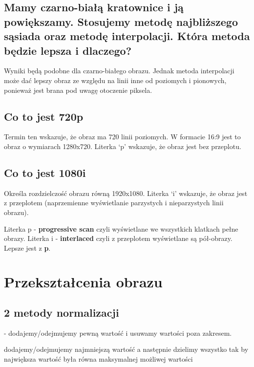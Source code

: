 \documentclass[a4paper, 12pt, titlepage]{article}
\begin{document}
\subsection{Mamy czarno-białą kratownice i ją powiększamy. Stosujemy metodę najbliższego sąsiada oraz metodę interpolacji. Która metoda będzie lepsza i dlaczego?}
Wyniki będą podobne dla czarno-białego obrazu. Jednak metoda interpolacji może dać lepszy obraz ze względu na linii inne od poziomych i pionowych, ponieważ jest brana pod uwagę otoczenie piksela.

\subsection{Co to jest 720p}
Termin ten wskazuje, że obraz ma 720 linii poziomych. W formacie 16:9 jest to
obraz o wymiarach 1280x720. Literka ‘p’ wskazuje, że obraz jest bez przeplotu.

\subsection{Co to jest 1080i}
Określa rozdzielczość obrazu równą 1920x1080. Literka ‘i’ wskazuje, że obraz jest z przeplotem (naprzemienne wyświetlanie parzystych i nieparzystych linii obrazu). \par
Literka p - \textbf{progressive scan} czyli wyświetlane we wszystkich klatkach pełne obrazy. Literka i - \textbf{interlaced} czyli z przeplotem wyświetlane są pół-obrazy. Lepsze jest z \textbf{p}.

\pagebreak\section{Przekształcenia obrazu}

\subsection{2 metody normalizacji}
\begin{description}[noitemsep]
	\item[Skalowanie z obcięciem] - dodajemy/odejmujemy pewną wartość i usuwamy wartości poza zakresem.
	\item[Skalowanie bez obcięcia] dodajemy/odejmujemy najmniejszą wartość a następnie dzielimy wszystko tak by największa wartość była równa maksymalnej możliwej wartości
\end{description}
\end{document}
